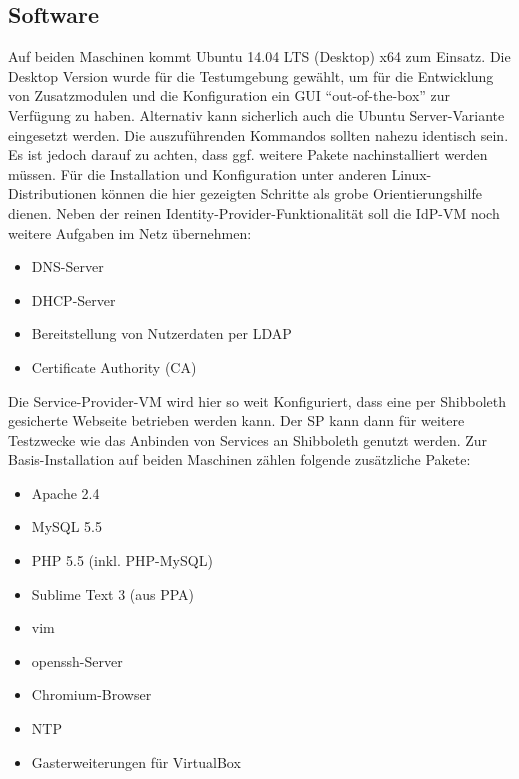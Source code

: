 \subsection{Software}
Auf beiden Maschinen kommt Ubuntu 14.04 LTS (Desktop) x64 zum Einsatz. Die
Desktop Version wurde für die Testumgebung gewählt, um für die Entwicklung von
Zusatzmodulen und die Konfiguration ein GUI "`out-of-the-box"' zur Verfügung zu
haben. Alternativ kann sicherlich auch die Ubuntu Server-Variante eingesetzt
werden. Die auszuführenden Kommandos sollten nahezu identisch sein. Es ist
jedoch darauf zu achten, dass ggf. weitere Pakete nachinstalliert werden müssen.
Für die Installation und Konfiguration unter anderen Linux-Distributionen können
die hier gezeigten Schritte als grobe Orientierungshilfe dienen.
\newline Neben der reinen Identity-Provider-Funktionalität soll die IdP-VM noch
weitere Aufgaben im Netz übernehmen:
\begin{itemize}
  \item DNS-Server
  \item DHCP-Server
  \item Bereitstellung von Nutzerdaten per LDAP
  \item Certificate Authority (CA)
\end{itemize}
Die Service-Provider-VM wird hier so weit Konfiguriert, dass eine per Shibboleth
gesicherte Webseite betrieben werden kann. Der SP kann dann für weitere
Testzwecke wie das Anbinden von Services an Shibboleth genutzt werden.
\newline Zur Basis-Installation auf beiden Maschinen zählen folgende
zusätzliche Pakete:
\begin{itemize}
  \item Apache 2.4
  \item MySQL 5.5
  \item PHP 5.5 (inkl. PHP-MySQL)
  \item Sublime Text 3 (aus PPA)
  \item vim
  \item openssh-Server
  \item Chromium-Browser
  \item NTP
  \item Gasterweiterungen für VirtualBox  
\end{itemize}
